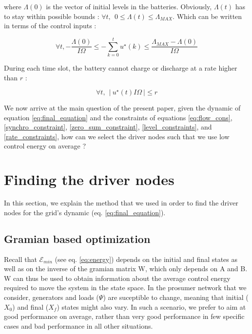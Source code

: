 \documentclass[conference]{IEEEtran}
\begin{document}
\noindent where $ \Lambda(0) $ is the vector of initial levels in the batteries. Obviously, $\Lambda(t)$ has to stay within possible bounds : $ \forall t, \ \ 0 \leq \Lambda(t) \leq \Lambda_{MAX} $. Which can be written in terms of the control inputs :

\begin{equation}
\label{level_constraints}
\forall t,-\frac{\Lambda(0)}{I \Omega} \leq -\sum_{k=0}^{t}u^{\star}(k) \leq \frac{ \Lambda_{MAX} - \Lambda(0)}{I \Omega}
\end{equation}

During each time slot, the battery cannot charge or discharge at a rate higher than $ r $ : 

\begin{equation}
\label{rate_constraints}
 \forall t,\ \ \left|\ u^{\star}(t)I \Omega\ \right| \leq r 
 \end{equation}

We now arrive at the main question of the present paper, given the dynamic of equation \ref{eq:final_equation} and the constraints of equations \ref{eq:flow_cons}, \ref{synchro_constraint}, \ref{zero_sum_constraint}, \ref{level_constraints}, and \ref{rate_constraints}, how can we select the driver nodes such that we use low control energy on average ?



\section{Finding the driver nodes}
\label{sec:control_and_submodularity}

In this section, we explain the method that we used in order to find the driver nodes for the grid's dynamic (eq. \ref{eq:final_equation}). 

\subsection{Gramian based optimization}

Recall that $\mathcal{E}_{min}$ (see eq. \ref{eq:energy}) depends on the initial and final states as well as on the inverse of the gramian matrix W, which only depends on A and B. W can thus be used to obtain information about the average control energy required to move the system in the state space. In the prosumer network that we consider, generators and loads ($\Psi$) are suceptible to change, meaning that initial ($X_0$) and final ($X_f$) states might also vary. In such a scenario, we prefer to aim at good performance on average, rather than very good performance in few specific cases and bad performance in all other situations.
\end{document}
